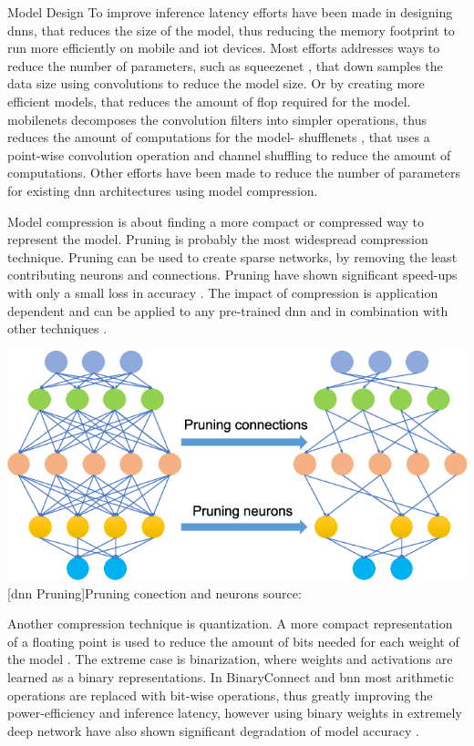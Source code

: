 \begin{enumdescript}
	\item[Model Design] To improve inference latency efforts have been made in designing \gls{dnn}s, that reduces the size of the model, thus reducing the memory footprint to run more efficiently on mobile and \gls{iot} devices. Most efforts addresses ways to reduce the number of parameters, such as \gls{squeezenet} \cite{iandola_squeezenet:_2016}, that down samples the data size using convolutions to reduce the model size. Or by creating more efficient models, that reduces the amount of \gls{flop} required for the model. \gls{mobilenet}s \cite{howard_mobilenets:_2017,sandler_mobilenetv2:_2018} decomposes the convolution filters into simpler operations, thus reduces the amount of computations for the model- \gls{shufflenet}s \cite{zhang_shufflenet:_2017, ma_shufflenet_2018}, that uses a point-wise convolution operation and channel shuffling to reduce the amount of computations. Other efforts have been made to reduce the number of parameters for existing \gls{dnn} architectures using model compression.
	
	\item[Model compression]  is about finding a more compact or compressed way to represent the model. Pruning is probably the most widespread compression technique. Pruning can be used to create sparse networks, by removing the least contributing neurons and connections. Pruning have shown significant speed-ups with only a small loss in accuracy \cite{zhou_edge_2019}. The impact of compression is application dependent and can be applied to any pre-trained \gls{dnn} and in combination with other techniques \cite{cheng_survey_2017}.
	
	\begin{minipage}[t]{\linewidth}
		\centering
		\includegraphics[width=.4\linewidth]{figures/articles/Pruning-a-neural-network}
		[\gls{dnn} Pruning]{Pruning conection and neurons source:  \cite{chen_deep_2019}}
	\end{minipage}
	
	Another compression technique is quantization. A more compact representation of a floating point is used to reduce the amount of bits needed for each weight of the model \cite{cheng_survey_2017}. The extreme case is binarization, where weights and activations are learned as a binary representations. In BinaryConnect \cite{courbariaux_binaryconnect:_2015} and \gls{bnn} \cite{courbariaux_binarized_2016} most arithmetic operations are replaced with bit-wise operations, thus greatly improving the power-efficiency and inference latency, however using binary weights in extremely deep network have also shown significant degradation of model accuracy \cite{cheng_survey_2017}.
	

\end{enumdescript}
